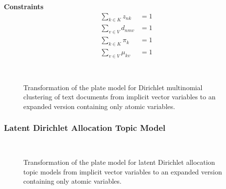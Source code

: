 \textbf{Constraints}
\begin{align}
\sum_{k \in K} z_{nk} &= 1\\
\sum_{v \in V} d_{nmv} &= 1\\
\sum_{k \in K} \pi_{k} &= 1\\
\sum_{v \in V} \mu_{kv} &= 1
\end{align}

\begin{figure}[t]
\begin{minipage}[t]{0.49\linewidth}
	\begin{center}
	\end{center}
\end{minipage}
\hspace{0.0cm}
\begin{minipage}[t]{0.49\linewidth}
	\begin{center}
	\end{center}
\end{minipage}\\
\caption{Transformation of the plate model for Dirichlet multinomial clustering of text documents from implicit vector variables to an expanded version containing only atomic variables.}
\label{img:clustering_platemodels}
\end{figure}

\subsubsection{Latent Dirichlet Allocation Topic Model}

\begin{figure}[t]
\begin{minipage}[t]{0.49\linewidth}
	\begin{center}
	\end{center}
\end{minipage}
\hspace{0.0cm}
\begin{minipage}[t]{0.49\linewidth}
	\begin{center}
	\end{center}
\end{minipage}\\
\caption{Transformation of the plate model for latent Dirichlet allocation topic models from implicit vector variables to an expanded version containing only atomic variables.}
\label{img:topic_platemodels}
\end{figure}
